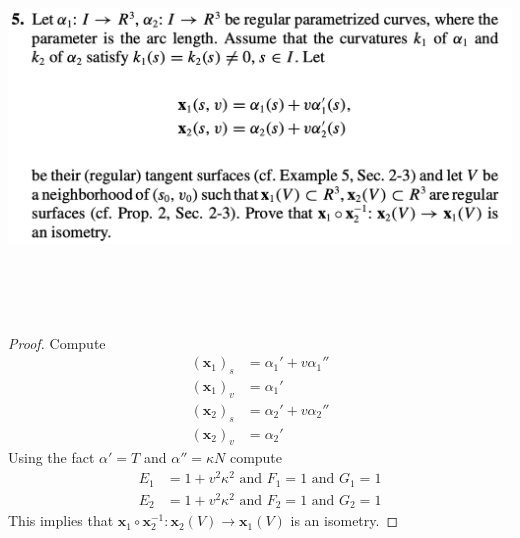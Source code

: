 \documentclass{report}
\begin{document}
\begin{question}{}{}
\includegraphics[height=10cm,width=18cm]{hw62}
\end{question}
\begin{proof}
Compute 
\begin{align*}
  (\textbf{x}_1)_s&=\alpha_1' + v\alpha_1''\\
  (\textbf{x}_1)_v&=\alpha_1'\\
  (\textbf{x}_2)_s&=\alpha_2' + v\alpha_2''\\
  (\textbf{x}_2)_v&=\alpha_2'
\end{align*}
Using the fact $\alpha'=T$ and $\alpha ''=\kappa N$  compute
\begin{align*}
E_1&=1+ v^2\kappa^2\text{ and }F_1=1\text{ and }G_1=1\\
E_2&=1+ v^2\kappa^2\text{ and }F_2=1\text{ and }G_2=1
\end{align*}
This implies that $\textbf{x}_1\circ \textbf{x}_2^{-1}:\textbf{x}_2(V)\rightarrow \textbf{x}_1(V)$ is an isometry.
\end{proof}
\end{document}
